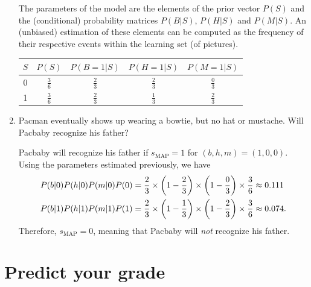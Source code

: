 \documentclass[11pt, a4paper]{article}
\begin{document}
\begin{enumerate}
    \begin{solution}
        The parameters of the model are the elements of the prior vector $P(S)$ and the (conditional) probability matrices $P(B | S)$, $P(H | S)$ and $P(M | S)$. An (unbiased) estimation of these elements can be computed as the frequency of their respective events within the learning set (of pictures).

        \begin{table}[h]
            \centering
            \begin{tabular}{c|cccc}
                \toprule
                $S$ & $P(S)$ & $P(B = 1 | S)$ & $P(H = 1 | S)$ & $P(M = 1 | S)$ \\
                \midrule
                0 & $\frac{3}{6}$ & $\frac{2}{3}$ & $\frac{2}{3}$ & $\frac{0}{3}$ \\
                1 & $\frac{3}{6}$ & $\frac{2}{3}$ & $\frac{1}{3}$ & $\frac{2}{3}$ \\
                \bottomrule
            \end{tabular}
        \end{table}
    \end{solution}

    \item Pacman eventually shows up wearing a bowtie, but no hat or mustache. Will Pacbaby recognize his father?

    \begin{solution}
        Pacbaby will recognize his father if $s_{\text{MAP}} = 1$ for $(b, h, m) = (1, 0, 0)$. Using the parameters estimated previously, we have
        \begin{align*}
            P(b | 0) P(h | 0) P(m | 0) P(0) & = \frac{2}{3} \times \rbk*{1 - \frac{2}{3}} \times \rbk*{1 - \frac{0}{3}} \times \frac{3}{6} \approx \num{0.111} \\
            P(b | 1) P(h | 1) P(m | 1) P(1) & = \frac{2}{3} \times \rbk*{1 - \frac{1}{3}} \times \rbk*{1 - \frac{2}{3}} \times \frac{3}{6} \approx \num{0.074} .
        \end{align*}
        Therefore, $s_{\text{MAP}} = 0$, meaning that Pacbaby will \emph{not} recognize his father.
    \end{solution}
\end{enumerate}

\newpage

\section{Predict your grade}
\end{document}
